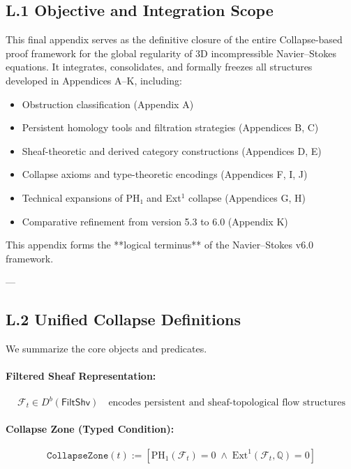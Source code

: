 \documentclass[11pt]{article}
\begin{document}
{{{\subsection*{L.1 Objective and Integration Scope}

This final appendix serves as the definitive closure of the entire Collapse-based proof framework  
for the global regularity of 3D incompressible Navier–Stokes equations.  
It integrates, consolidates, and formally freezes all structures developed in Appendices A–K, including:

\begin{itemize}
  \item Obstruction classification (Appendix A)
  \item Persistent homology tools and filtration strategies (Appendices B, C)
  \item Sheaf-theoretic and derived category constructions (Appendices D, E)
  \item Collapse axioms and type-theoretic encodings (Appendices F, I, J)
  \item Technical expansions of PH₁ and Ext$^1$ collapse (Appendices G, H)
  \item Comparative refinement from version 5.3 to 6.0 (Appendix K)
\end{itemize}

This appendix forms the **logical terminus** of the Navier–Stokes v6.0 framework.

---

\subsection*{L.2 Unified Collapse Definitions}

We summarize the core objects and predicates.

\paragraph{Filtered Sheaf Representation:}
\[
\mathcal{F}_t \in D^b(\mathsf{FiltShv})
\quad \text{encodes persistent and sheaf-topological flow structures}
\]

\paragraph{Collapse Zone (Typed Condition):}
\[
\texttt{CollapseZone}(t) :=
\left[
\mathrm{PH}_1(\mathcal{F}_t) = 0
\;\land\;
\mathrm{Ext}^1(\mathcal{F}_t, \mathbb{Q}) = 0
\right]
\]

}}}
\end{document}
